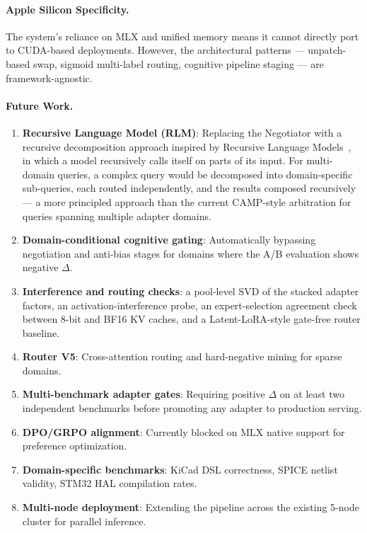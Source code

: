 \documentclass[11pt,a4paper]{article}
\begin{document}
\paragraph{Apple Silicon Specificity.}
The system's reliance on MLX and unified memory means it cannot directly port to CUDA-based deployments. However, the architectural patterns --- unpatch-based swap, sigmoid multi-label routing, cognitive pipeline staging --- are framework-agnostic.

\paragraph{Future Work.}
\begin{enumerate}[nosep]
  \item \textbf{Recursive Language Model (RLM)}: Replacing the Negotiator with a recursive decomposition approach inspired by Recursive Language Models~\citep{rlm2025}, in which a model recursively calls itself on parts of its input. For multi-domain queries, a complex query would be decomposed into domain-specific sub-queries, each routed independently, and the results composed recursively --- a more principled approach than the current CAMP-style arbitration for queries spanning multiple adapter domains.
  \item \textbf{Domain-conditional cognitive gating}: Automatically bypassing negotiation and anti-bias stages for domains where the A/B evaluation shows negative $\Delta$.
  \item \textbf{Interference and routing checks}: a pool-level SVD of the stacked adapter factors, an activation-interference probe, an expert-selection agreement check between 8-bit and BF16 KV caches, and a Latent-LoRA-style gate-free router baseline.
  \item \textbf{Router V5}: Cross-attention routing and hard-negative mining for sparse domains.
  \item \textbf{Multi-benchmark adapter gates}: Requiring positive $\Delta$ on at least two independent benchmarks before promoting any adapter to production serving.
  \item \textbf{DPO/GRPO alignment}: Currently blocked on MLX native support for preference optimization.
  \item \textbf{Domain-specific benchmarks}: KiCad DSL correctness, SPICE netlist validity, STM32 HAL compilation rates.
  \item \textbf{Multi-node deployment}: Extending the pipeline across the existing 5-node cluster for parallel inference.

\end{enumerate}
\end{document}
